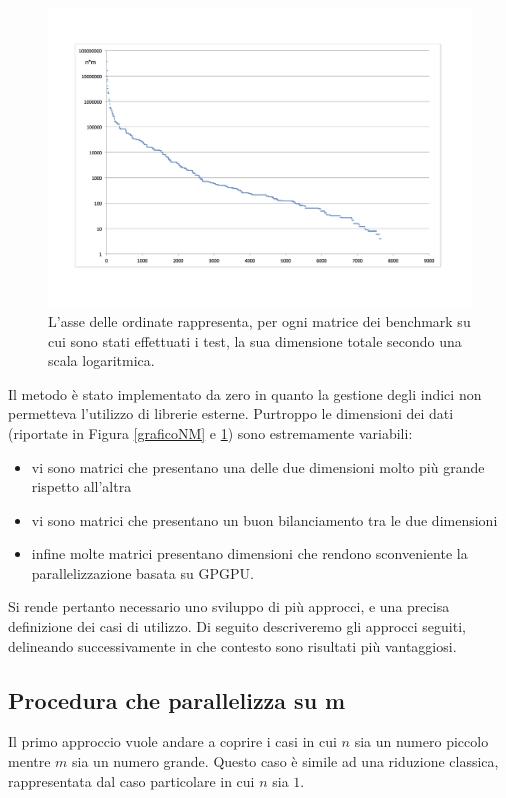 \documentclass[a4paper]{article}   %
\begin{document}
 \begin{figure}[!h]
\includegraphics[scale=0.44]{sommavaloretotale.png}
\caption{L'asse delle ordinate rappresenta, per ogni matrice dei benchmark su cui sono stati effettuati i test, la sua dimensione totale secondo una scala logaritmica.}
\label{sommavaloretotale}
\end{figure}

Il metodo è stato implementato da zero in quanto la gestione degli indici non permetteva l’utilizzo di librerie esterne.
Purtroppo le dimensioni dei dati (riportate in Figura \ref{graficoNM} e \ref{sommavaloretotale}) sono estremamente variabili: 
\begin{itemize}
\item vi sono matrici che presentano una delle due dimensioni molto più grande rispetto all’altra
\item vi sono matrici che presentano un buon bilanciamento tra le due dimensioni
\item infine molte matrici presentano dimensioni che rendono sconveniente la parallelizzazione basata su GPGPU.
\end{itemize}
Si rende pertanto necessario uno sviluppo di più approcci, e una precisa definizione dei casi di utilizzo. Di seguito descriveremo gli approcci seguiti, delineando successivamente in che contesto sono risultati più vantaggiosi.

\subsection{Procedura che parallelizza su m}
Il primo approccio vuole andare a coprire i casi in cui $n$ sia un numero piccolo mentre $m$ sia un numero grande. Questo caso è simile ad una riduzione classica, rappresentata dal caso particolare in cui $n$ sia $1$.
\end{document}
